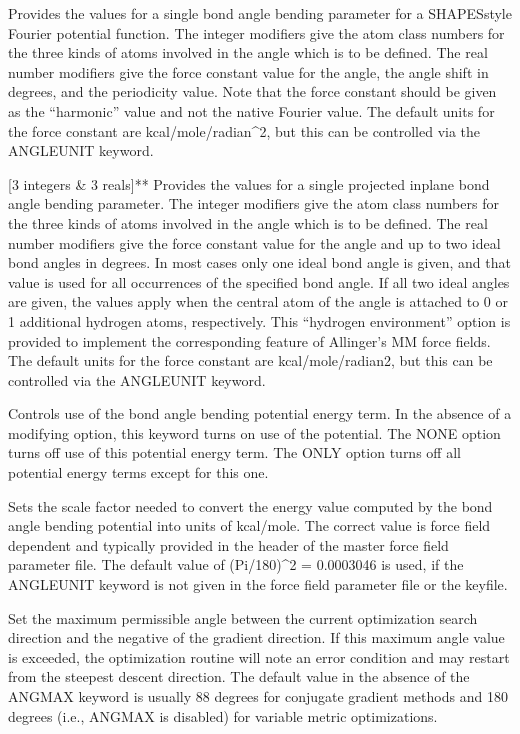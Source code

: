 \documentclass[letterpaper,11pt,english]{sphinxmanual}
\begin{document}
  Provides the values for a single bond angle bending parameter for a SHAPES\sphinxhyphen{}style Fourier potential function. The integer modifiers give the atom class numbers for the three kinds of atoms involved in the angle which is to be defined. The real number modifiers give the force constant value for the angle, the angle shift in degrees, and the periodicity value. Note that the force constant should be given as the “harmonic” value and not the native Fourier value. The default units for the force constant are kcal/mole/radian\textasciicircum{}2, but this can be controlled via the ANGLEUNIT keyword.

 {[}3 integers \& 3 reals{]}**  Provides the values for a single projected in\sphinxhyphen{}plane bond angle bending parameter. The integer modifiers give the atom class numbers for the three kinds of atoms involved in the angle which is to be defined. The real number modifiers give the force constant value for the angle and up to two ideal bond angles in degrees. In most cases only one ideal bond angle is given, and that value is used for all occurrences of the specified bond angle. If all two ideal angles are given, the values apply when the central atom of the angle is attached to 0 or 1 additional hydrogen atoms, respectively. This “hydrogen environment” option is provided to implement the corresponding feature of Allinger’s MM force fields. The default units for the force constant are kcal/mole/radian2, but this can be controlled via the ANGLEUNIT keyword.

  Controls use of the bond angle bending potential energy term. In the absence of a modifying option, this keyword turns on use of the potential. The NONE option turns off use of this potential energy term. The ONLY option turns off all potential energy terms except for this one.

  Sets the scale factor needed to convert the energy value computed by the bond angle bending potential into units of kcal/mole. The correct value is force field dependent and typically provided in the header of the master force field parameter file. The default value of (Pi/180)\textasciicircum{}2 = 0.0003046 is used, if the ANGLEUNIT keyword is not given in the force field parameter file or the keyfile.

  Set the maximum permissible angle between the current optimization search direction and the negative of the gradient direction. If this maximum angle value is exceeded, the optimization routine will note an error condition and may restart from the steepest descent direction. The default value in the absence of the ANGMAX keyword is usually 88 degrees for conjugate gradient methods and 180 degrees (i.e., ANGMAX is disabled) for variable metric optimizations.
\end{document}
